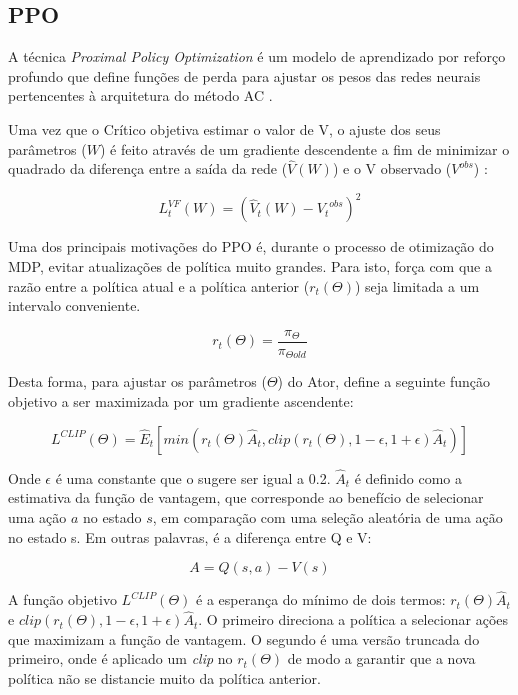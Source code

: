 \subsection{PPO}

A técnica \textit{Proximal Policy Optimization} é um modelo de aprendizado por reforço profundo que define funções de perda para ajustar os pesos das redes neurais pertencentes à arquitetura do método AC \cite{PPO}. 

Uma vez que o Crítico objetiva estimar o valor de V, o ajuste dos seus parâmetros ($W$) é feito através de um gradiente descendente a fim de minimizar o quadrado da diferença entre a saída da rede ($\hat{V}(W)$) e o V observado ($V^{obs}$) \cite{PPO}:


\begin{equation}
    L^{VF}_t(W) = (\hat{V}_t(W) - {V_t}^{obs})^2 
\end{equation}

\noindent
Uma dos principais motivações do PPO é, durante o processo de otimização do MDP, evitar atualizações de política muito grandes. 
Para isto, \cite{PPO} força com que a razão entre a política atual e a política anterior ($r_t(\Theta)$) seja limitada a um intervalo conveniente. 

\begin{equation}
    r_t(\Theta) = \frac{\pi_\Theta}{\pi_{\Theta old}}
\end{equation}

\noindent
Desta forma, para ajustar os parâmetros ($\Theta$) do Ator, \cite{PPO} define a seguinte função objetivo a ser maximizada por um gradiente ascendente:

\begin{equation}
   L^{CLIP}(\Theta) = \hat{E}_t [min(r_t (\Theta) \hat{A}_t, clip(r_t (\Theta), 1-\epsilon, 1+\epsilon) \hat{A}_t)]
\end{equation}

\noindent
Onde $\epsilon$ é uma constante que o \cite{PPO} sugere ser igual a 0.2. $\hat{A}_t$ é definido como a estimativa da função de vantagem, que corresponde ao benefício de selecionar uma ação $a$ no estado $s$, em comparação com uma seleção aleatória de uma ação no estado s. Em outras palavras, é a diferença entre Q e V:

\begin{equation}
   A = Q(s,a) - V(s)
\end{equation}

A função objetivo $L^{CLIP}(\Theta)$ é a esperança do mínimo de dois termos: $r_t(\Theta) \hat{A}_t$ e $clip(r_t (\Theta), 1-\epsilon, 1+\epsilon) \hat{A}_t$. O primeiro direciona a política a selecionar ações que maximizam a função de vantagem. O segundo é uma versão truncada do primeiro, onde é aplicado um \textit{clip} no $r_t(\Theta)$ de modo a garantir que a nova política não se distancie muito da política anterior. 

